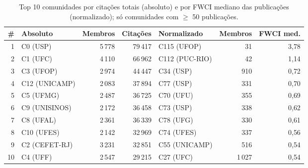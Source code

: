 \begin{table}[htbp]
\centering
\small
\caption{Top 10 comunidades por citações totais (absoluto) e por FWCI mediano das publicações (normalizado); só comunidades com $\geq$ 50 publicações.}
\label{tab:impacto}
\begin{tabular}{rlrrlrr}
\hline
\# & Absoluto & Membros & Citações & Normalizado & Membros & FWCI med. \\
\hline
1 & C0 (USP) & 5\,778 & 79\,417 & C115 (UFOP) & 31 & 3{,}78 \\
2 & C1 (UFC) & 4\,110 & 66\,962 & C112 (PUC-RIO) & 42 & 1{,}14 \\
3 & C3 (UFOP) & 2\,974 & 44\,447 & C34 (USP) & 910 & 0{,}72 \\
4 & C12 (UNICAMP) & 2\,083 & 37\,894 & C77 (USP) & 331 & 0{,}70 \\
5 & C5 (UFMG) & 2\,487 & 36\,725 & C70 (UFU) & 355 & 0{,}69 \\
6 & C9 (UNISINOS) & 2\,172 & 36\,458 & C73 (USP) & 338 & 0{,}62 \\
7 & C8 (UFAL) & 2\,361 & 36\,339 & C78 (UFG) & 330 & 0{,}61 \\
8 & C10 (UFES) & 2\,142 & 32\,969 & C74 (UFES) & 337 & 0{,}56 \\
9 & C2 (CEFET-RJ) & 3\,231 & 32\,851 & C55 (UNICAMP) & 516 & 0{,}54 \\
10 & C4 (UFF) & 2\,547 & 29\,215 & C27 (UFC) & 1\,027 & 0{,}54 \\
\hline
\end{tabular}
\end{table}
